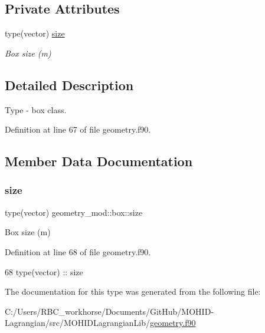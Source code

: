 \subsection*{Private Attributes}
\begin{DoxyCompactItemize}
\item 
type(vector) \mbox{\hyperlink{structgeometry__mod_1_1box_aca87e2761faa8b1ce447347a31fd26f9}{size}}
\begin{DoxyCompactList}\small\item\em Box size (m) \end{DoxyCompactList}\end{DoxyCompactItemize}


\subsection{Detailed Description}
Type -\/ box class. 

Definition at line 67 of file geometry.\+f90.



\subsection{Member Data Documentation}
\mbox{\label{structgeometry__mod_1_1box_aca87e2761faa8b1ce447347a31fd26f9}} 
\subsubsection{\texorpdfstring{size}{size}}
{\footnotesize\ttfamily type(vector) geometry\+\_\+mod\+::box\+::size\hspace{0.3cm}{\ttfamily [private]}}



Box size (m) 



Definition at line 68 of file geometry.\+f90.


\begin{DoxyCode}
68         \textcolor{keywordtype}{type}(vector) :: size
\end{DoxyCode}


The documentation for this type was generated from the following file\+:\begin{DoxyCompactItemize}
\item 
C\+:/\+Users/\+R\+B\+C\+\_\+workhorse/\+Documents/\+Git\+Hub/\+M\+O\+H\+I\+D-\/\+Lagrangian/src/\+M\+O\+H\+I\+D\+Lagrangian\+Lib/\mbox{\hyperlink{geometry_8f90}{geometry.\+f90}}\end{DoxyCompactItemize}
